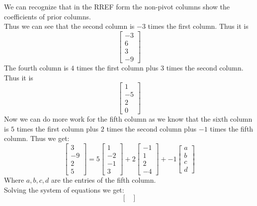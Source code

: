\documentclass[answers,12pt,addpoints]{exam}
\begin{document}
\begin{questions}
\begin{solution}
        We can recognize that in the RREF form the non-pivot columns show the coefficients of prior columns.\\
        Thus we can see that the second column is $-3$ times the first column. Thus it is 
        $$ \begin{bmatrix}
            -3\\
            6\\
            3\\
            -9
        \end{bmatrix}$$
        The fourth column is $4$ times the first column plus $3$ times the second column. Thus it is
        $$ \begin{bmatrix}
            1\\
            -5\\
            2\\
            0
        \end{bmatrix}
        $$
        Now we can do more work for the fifth column as we know that the sixth column is $5$ times the first column plus $2$ times the second column plus $-1$ times the fifth column. Thus we get:
        $$ \begin{bmatrix}
            3\\
            -9\\
            2\\
            5
        \end{bmatrix} = 5\begin{bmatrix}
            1\\
            -2\\
            -1\\
            3
        \end{bmatrix} + 2\begin{bmatrix}
            -1\\
            1\\
            2\\
            -4
        \end{bmatrix} + -1 \begin{bmatrix}
            a\\
            b\\
            c\\
            d
        \end{bmatrix}$$
        Where $a,b,c,d$ are the entries of the fifth column.\\
        Solving the system of equations we get:
        $$ \begin{bmatrix}

\end{bmatrix}$$
\end{solution}
\end{questions}
\end{document}
